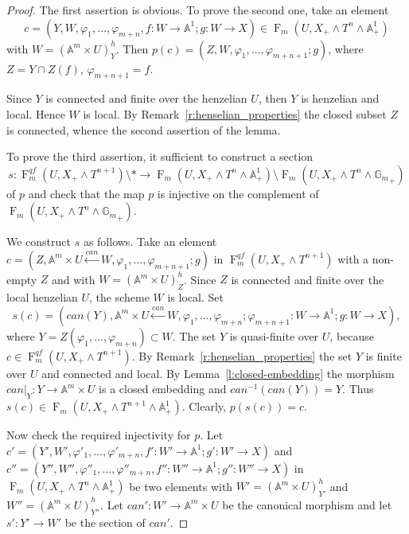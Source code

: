 \documentclass[a4paper,11pt,reqno]{amsart}
\begin{document}
\begin{proof}
The first assertion is obvious. To prove the second one, take an
element
   $$c=(Y,W,{\varphi}_1,\ldots,{\varphi}_{m+n},f:W\to {\mathbb{A}}^1;g:W\to X) \in {\operatorname{F}}_m(U,X_+\wedge T^{n}\wedge {\mathbb{A}}^1_+)$$
with $W=({\mathbb{A}}^m\times U)^h_Y$. Then
$p(c)=(Z,W,{\varphi}_1,\ldots,{\varphi}_{m+n+1};g)$, where $Z=Y\cap Z(f)$,
${\varphi}_{m+n+1}=f$.

Since $Y$ is connected and finite over the henzelian $U$, then $Y$
is henzelian and local. Hence $W$ is local. By
Remark~\ref{r:henselian_properties} the closed subset $Z$ is
connected, whence the second assertion of the lemma.

To prove the third assertion, it sufficient to construct a section
   $$s:{\operatorname{F}}^{qf}_m(U,X_+\wedge T^{n+1})\setminus * \to {\operatorname{F}}_m(U,X_+\wedge T^{n}\wedge{\mathbb{A}}^1_+)\setminus {\operatorname{F}}_m(U,X_+\wedge T^{n}\wedge{{\mathbb{G}_m}}_+)$$
of $p$ and check that the map $p$ is injective on the complement of
${\operatorname{F}}_m(U,X_+\wedge T^{n}\wedge{{\mathbb{G}_m}}_+)$.

We construct $s$ as follows. Take an element $c=(Z,{\mathbb{A}}^m\times
U\xleftarrow{can} W,{\varphi}_1,\ldots,{\varphi}_{m+n+1};g)$ in
${\operatorname{F}}^{qf}_m(U,X_+\wedge T^{n+1})$ with a non-empty $Z$ and with
$W=({\mathbb{A}}^m\times U)^h_Z$. Since $Z$ is connected and finite over the
local henzelian $U$, the scheme $W$ is local. Set
   $$s(c)=(can(Y),{\mathbb{A}}^m\times U\xleftarrow{can} W,{\varphi}_1,\ldots,{\varphi}_{m+n};{\varphi}_{m+n+1}:W\to {\mathbb{A}}^1;g:W\to X),$$
where $Y=Z({\varphi}_1,\ldots,{\varphi}_{m+n})\subset W$. The set $Y$ is
quasi-finite over $U$, because $c\in {\operatorname{F}}^{qf}_m(U,X_+\wedge
T^{n+1})$. By Remark~\ref{r:henselian_properties} the set $Y$ is
finite over $U$ and connected and local. By
Lemma~\ref{l:closed-embedding} the morphism $can|_{Y}:Y\to
{\mathbb{A}}^m\times U$ is a closed embedding and $can^{-1}(can(Y))=Y$. Thus
$s(c)\in {\operatorname{F}}_m(U,X_+\wedge T^{n+1}\wedge {\mathbb{A}}^1_+).$ Clearly,
$p(s(c))=c$.

Now check the required injectivity for $p$. Let
$c'=(Y',W',{\varphi}'_1,\ldots,{\varphi}'_{m+n},f':W'\to {\mathbb{A}}^1;g':W'\to X)$ and
$c''=(Y'',W'',{\varphi}''_1,\ldots,{\varphi}''_{m+n},f'':W''\to
{\mathbb{A}}^1;g'':W''\to X)$ in ${\operatorname{F}}_m(U,X_+\wedge T^{n}\wedge {\mathbb{A}}^1_+)$ be two
elements with $W'=({\mathbb{A}}^m\times U)^h_{Y'}$ and $W''=({\mathbb{A}}^m\times
U)^h_{Y''}$. Let $can':W'\to {\mathbb{A}}^m\times U$ be the canonical morphism
and let $s':Y'\to W'$ be the section of $can'$.


\end{proof}
\end{document}
